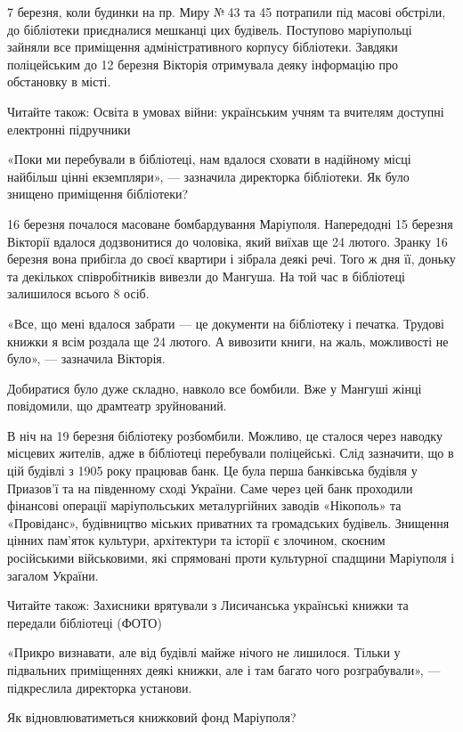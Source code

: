 7 березня, коли будинки на пр. Миру № 43 та 45 потрапили під масові обстріли,
до бібліотеки приєдналися мешканці цих будівель. Поступово маріупольці зайняли
все приміщення адміністративного корпусу бібліотеки. Завдяки поліцейським до 12
березня Вікторія отримувала деяку інформацію про обстановку в місті.

Читайте також: Освіта в умовах війни: українським учням та вчителям доступні
електронні підручники

«Поки ми перебували в бібліотеці, нам вдалося сховати в надійному місці
найбільш цінні екземпляри», — зазначила директорка бібліотеки.  Як було знищено
приміщення бібліотеки?

16 березня почалося масоване бомбардування Маріуполя. Напередодні 15 березня
Вікторії вдалося додзвонитися до чоловіка, який виїхав ще 24 лютого. Зранку 16
березня вона прибігла до своєї квартири і зібрала деякі речі. Того ж дня її,
доньку та декількох співробітників вивезли до Мангуша. На той час в бібліотеці
залишилося всього 8 осіб.

«Все, що мені вдалося забрати — це документи на бібліотеку і печатка. Трудові
книжки я всім роздала ще 24 лютого. А вивозити книги, на жаль, можливості не
було», — зазначила Вікторія.

Добиратися було дуже складно, навколо все бомбили. Вже у Мангуші жінці
повідомили, що драмтеатр зруйнований.

В ніч на 19 березня бібліотеку розбомбили. Можливо, це сталося через наводку
місцевих жителів, адже в бібліотеці перебували поліцейські. Слід зазначити, що
в цій будівлі з 1905 року працював банк. Це була перша банківська будівля у
Приазов'ї та на південному сході України. Саме через цей банк проходили
фінансові операції маріупольських металургійних заводів «Нікополь» та
«Провіданс», будівництво міських приватних та громадських будівель. Знищення
цінних пам’яток культури, архітектури та історії є злочином, скоєним
російськими військовими, які спрямовані проти культурної спадщини Маріуполя і
загалом України.

Читайте також: Захисники врятували з Лисичанська українські книжки та передали
бібліотеці (ФОТО)

«Прикро визнавати, але від будівлі майже нічого не лишилося. Тільки у
підвальних приміщеннях деякі книжки, але і там багато чого розграбували», —
підкреслила директорка установи.

Як відновлюватиметься книжковий фонд Маріуполя?

